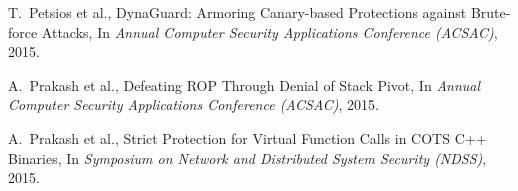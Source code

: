 \documentclass[11pt,a4paper,bibtotoc,idxtotoc,headsepline,footsepline,footexclude,BCOR12mm,DIV13]{scrbook}
\begin{document}
\begin{thebibliography}{50}
T.~Petsios et al., {DynaGuard: Armoring Canary-based Protections against Brute-force Attacks}, In
\emph{Annual Computer Security Applications Conference (ACSAC)}, 2015.

A.~Prakash et al., {Defeating ROP Through Denial of Stack Pivot}, In
\emph{Annual Computer Security Applications Conference (ACSAC)}, 2015.

A.~Prakash et al., {Strict Protection for Virtual Function Calls in COTS C++ Binaries}, In
\emph{Symposium on Network and Distributed System Security (NDSS)}, 2015.



\end{thebibliography}
	
 
\end{document}

